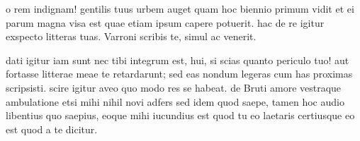 


 o rem indignam! gentilis tuus urbem auget quam hoc biennio primum vidit et ei parum magna visa est quae etiam ipsum capere potuerit. hac de re igitur exspecto litteras tuas. Varroni scribis te, simul ac venerit.

 dati igitur iam sunt nec tibi integrum est, hui, si scias quanto periculo tuo! aut fortasse litterae meae te retardarunt; sed eas nondum legeras cum has proximas scripsisti. scire igitur aveo quo modo res se habeat. de Bruti amore vestraque ambulatione etsi mihi nihil novi adfers sed idem quod saepe, tamen hoc audio libentius quo saepius, eoque mihi iucundius est quod tu eo laetaris certiusque eo est quod a te dicitur.
